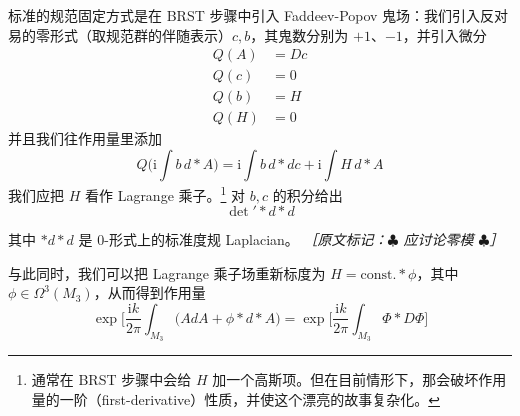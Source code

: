 标准的规范固定方式是在 BRST 步骤中引入 Faddeev-Popov 鬼场：我们引入反对易的零形式（取规范群的伴随表示）$c,b$，其鬼数分别为 $+1$、$-1$，并引入微分
\begin{equation}
  \begin{aligned}
    Q(A) &= Dc\\
    Q(c) &= 0\\
    Q(b) &= H\\
    Q(H) &= 0
  \end{aligned}
  \tag{2.282}
  \label{eq:2.282}
\end{equation}
并且我们往作用量里添加
\begin{equation}
  Q\Big(\mathrm{i}\int b\,d*A\Big)=\mathrm{i}\int b\,d*dc+\mathrm{i}\int H\,d*A
  \tag{2.283}
  \label{eq:2.283}
\end{equation}
我们应把 $H$ 看作 Lagrange 乘子。\footnote{通常在 BRST 步骤中会给 $H$ 加一个高斯项。但在目前情形下，那会破坏作用量的一阶（first-derivative）性质，并使这个漂亮的故事复杂化。} 对 $b,c$ 的积分给出
\begin{equation}
  \det' *d*d
  \tag{2.284}
  \label{eq:2.284}
\end{equation}

其中 $*d*d$ 是 0-形式上的标准度规 Laplacian。
{\small\itshape ［原文标记：\ensuremath{\clubsuit} 应讨论零模 \ensuremath{\clubsuit}］}

与此同时，我们可以把 Lagrange 乘子场重新标度为 $H=\text{const.}*\phi$，其中 $\phi\in\Omega^{3}(M_3)$，从而得到作用量
\begin{equation}
  \exp\Big[\frac{\mathrm{i}k}{2\pi}\int_{M_3}\big(AdA+\phi*d*A\big)
  =\exp\Big[\frac{\mathrm{i}k}{2\pi}\int_{M_3}\Phi*D\Phi\Big]
  \tag{2.285}
  \label{eq:2.285}
\end{equation}

